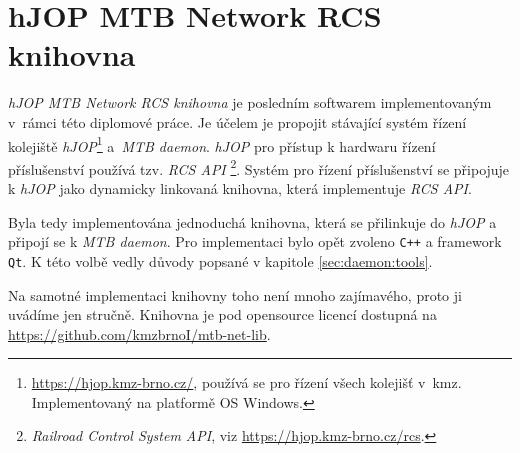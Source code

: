 \section{hJOP MTB Network RCS knihovna} \label{sec:mtb-net-lib}

\textit{hJOP MTB Network RCS knihovna} je posledním softwarem implementovaným
v~rámci této diplomové práce. Je účelem je propojit stávající systém řízení
kolejiště \textit{hJOP}\footnote{\url{https://hjop.kmz-brno.cz/}, používá se
pro řízení všech kolejišť v~\gls{kmz}. Implementovaný na platformě OS Windows.}
a~\textit{MTB daemon}. \textit{hJOP} pro přístup k hardwaru řízení
příslušenství používá tzv. \textit{RCS API} \footnote{\textit{Railroad Control
System API}, viz \url{https://hjop.kmz-brno.cz/rcs}.}. Systém pro řízení
příslušenství se připojuje k \textit{hJOP} jako dynamicky linkovaná knihovna,
která implementuje \textit{RCS API}.

Byla tedy implementována jednoduchá knihovna, která se přilinkuje do
\textit{hJOP} a připojí se k \textit{MTB daemon}. Pro implementaci bylo
opět zvoleno \texttt{C++} a framework \texttt{Qt}. K této volbě vedly důvody
popsané v kapitole \ref{sec:daemon:tools}.

Na samotné implementaci knihovny toho není mnoho zajímavého, proto ji uvádíme
jen stručně. Knihovna je pod opensource licencí dostupná na
\url{https://github.com/kmzbrnoI/mtb-net-lib}.
